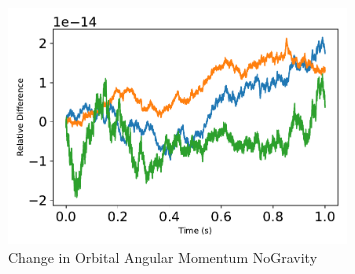 \begin{figure}[htbp]\centerline{\includegraphics[width=0.8\textwidth]{AutoTeX/ChangeInOrbitalAngularMomentumNoGravity}}\caption{Change in Orbital Angular Momentum NoGravity}\label{fig:ChangeInOrbitalAngularMomentumNoGravity}\end{figure}